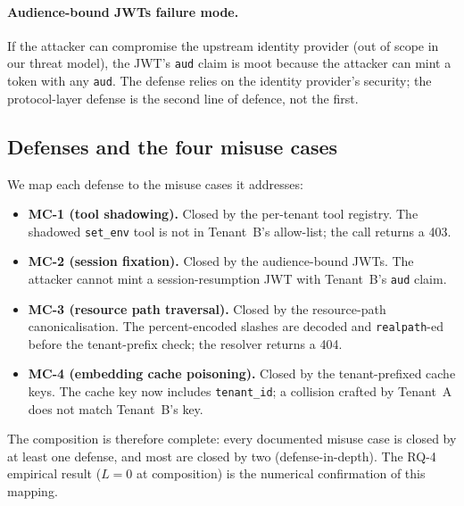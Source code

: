 \paragraph{Audience-bound JWTs failure mode.} If the attacker
can compromise the upstream identity provider (out of scope
in our threat model), the JWT's \texttt{aud} claim is moot
because the attacker can mint a token with any
\texttt{aud}. The defense relies on the identity provider's
security; the protocol-layer defense is the second line of
defence, not the first.

\subsection{Defenses and the four misuse cases}

We map each defense to the misuse cases it addresses:

\begin{itemize}
  \item \textbf{MC-1 (tool shadowing).} Closed by the
        per-tenant tool registry. The shadowed \texttt{set\_env}
        tool is not in Tenant~B's allow-list; the call
        returns a 403.
  \item \textbf{MC-2 (session fixation).} Closed by the
        audience-bound JWTs. The attacker cannot mint a
        session-resumption JWT with Tenant~B's
        \texttt{aud} claim.
  \item \textbf{MC-3 (resource path traversal).} Closed by
        the resource-path canonicalisation. The
        percent-encoded slashes are decoded and
        \texttt{realpath}-ed before the tenant-prefix check;
        the resolver returns a 404.
  \item \textbf{MC-4 (embedding cache poisoning).} Closed by
        the tenant-prefixed cache keys. The cache key now
        includes \texttt{tenant\_id}; a collision crafted by
        Tenant~A does not match Tenant~B's key.
\end{itemize}

The composition is therefore complete: every documented
misuse case is closed by at least one defense, and most are
closed by two (defense-in-depth). The RQ-4 empirical result
($L = 0$ at composition) is the numerical confirmation of
this mapping.